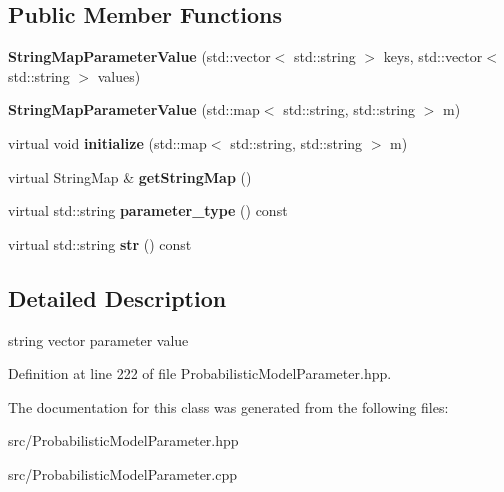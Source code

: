 \subsection*{Public Member Functions}
\begin{DoxyCompactItemize}
\item 
\mbox{\label{classtops_1_1StringMapParameterValue_a03e3e3e2158360b599e816514db29562}} 
{\bfseries String\+Map\+Parameter\+Value} (std\+::vector$<$ std\+::string $>$ keys, std\+::vector$<$ std\+::string $>$ values)
\item 
\mbox{\label{classtops_1_1StringMapParameterValue_add2d6c6ab50a2e9adec248f8ed79099a}} 
{\bfseries String\+Map\+Parameter\+Value} (std\+::map$<$ std\+::string, std\+::string $>$ m)
\item 
\mbox{\label{classtops_1_1StringMapParameterValue_a08d20322c13ee984d609532232228eec}} 
virtual void {\bfseries initialize} (std\+::map$<$ std\+::string, std\+::string $>$ m)
\item 
\mbox{\label{classtops_1_1StringMapParameterValue_a2ec133784035e95bc2592cde3e8ffa8a}} 
virtual String\+Map \& {\bfseries get\+String\+Map} ()
\item 
\mbox{\label{classtops_1_1StringMapParameterValue_aed07069c55c00fc65d097e2289628ca6}} 
virtual std\+::string {\bfseries parameter\+\_\+type} () const
\item 
\mbox{\label{classtops_1_1StringMapParameterValue_a6cdc9179cfade9959fd333e1e7799164}} 
virtual std\+::string {\bfseries str} () const
\end{DoxyCompactItemize}


\subsection{Detailed Description}
string vector parameter value 

Definition at line 222 of file Probabilistic\+Model\+Parameter.\+hpp.



The documentation for this class was generated from the following files\+:\begin{DoxyCompactItemize}
\item 
src/Probabilistic\+Model\+Parameter.\+hpp\item 
src/Probabilistic\+Model\+Parameter.\+cpp\end{DoxyCompactItemize}
